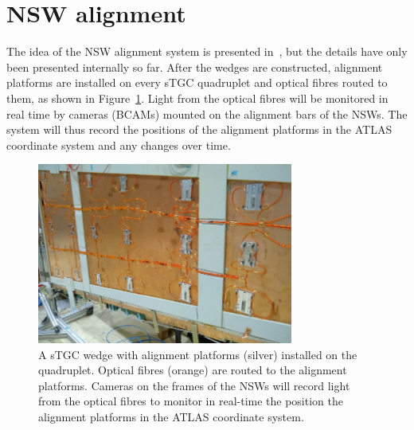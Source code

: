 \section{NSW alignment}
\label{sec:nsw_alignment}

The idea of the NSW alignment system is presented in~\cite{nsw_tdr}, but the details have only been presented internally so far. After the wedges are constructed, alignment platforms are installed on every sTGC quadruplet and optical fibres routed to them, as shown in Figure~\ref{fig:alignment_platforms}. Light from the optical fibres will be monitored in real time by cameras (BCAMs) mounted on the alignment bars of the NSWs. The system will thus record the positions of the alignment platforms in the ATLAS coordinate system and any changes over time. %

\begin{figure}[h]
    \centering
    \includegraphics[width = 0.75\textwidth]{figures/alignment_platforms_lefebvre.png}
    \caption{A sTGC wedge with alignment platforms (silver) installed on the quadruplet. Optical fibres (orange) are routed to the alignment platforms. Cameras on the frames of the NSWs will record light from the optical fibres to monitor in real-time the position the alignment platforms in the ATLAS coordinate system.}
    \label{fig:alignment_platforms}
\end{figure}

